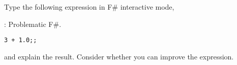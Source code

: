 Type the following expression in F\# interactive mode,
  \begin{codeNOutput}{: Problematic F\#.}
\begin{lstlisting}
3 + 1.0;;
\end{lstlisting}
\end{codeNOutput}
and explain the result. Consider whether you can improve the expression.
